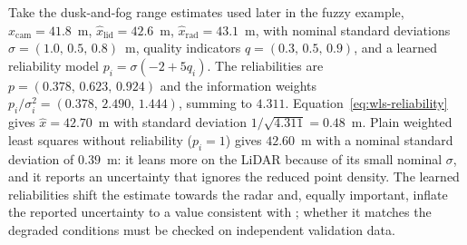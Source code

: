 \documentclass[graybox,envcountchap]{style/SNmono}
\providecommand{\DIFadd}[1]{{\protect\color{blue} #1}} %
\providecommand{\DIFdel}[1]{{\protect\color{red} #1}} %
\providecommand{\DIFaddbegin}{} %
\providecommand{\DIFaddend}{} %
\providecommand{\DIFdelbegin}{} %
\providecommand{\DIFdelend}{} %
\begin{document}
\begin{example}
\label{ex:logistic-wls}
Take the dusk-and-fog range estimates used later in the fuzzy example, $\widehat{x}_{\mathrm{cam}}=41.8$~m, $\widehat{x}_{\mathrm{lid}}=42.6$~m, $\widehat{x}_{\mathrm{rad}}=43.1$~m, with nominal standard deviations $\sigma=(1.0,\,0.5,\,0.8)$~m, quality indicators $q=(0.3,\,0.5,\,0.9)$, and a learned reliability model $p_i=\sigma(-2+5q_i)$. The reliabilities are $p=(0.378,\,0.623,\,0.924)$ and the information weights $p_i/\sigma_i^{2}=(0.378,\,2.490,\,1.444)$, summing to $4.311$. Equation~\eqref{eq:wls-reliability} gives $\widehat{x}=42.70$~m with standard deviation $1/\sqrt{4.311}=0.48$~m. Plain weighted least squares without reliability ($p_i=1$) gives $42.60$~m with a nominal standard deviation of $0.39$~m: it leans more on the LiDAR because of its small nominal $\sigma$, and it reports an uncertainty that ignores the reduced point density. The learned reliabilities shift the estimate towards the radar and, equally important, inflate the reported uncertainty\DIFdelbegin \DIFdel{to a value consistent with }\DIFdelend \DIFaddbegin \DIFadd{; whether it matches }\DIFaddend the degraded conditions \DIFaddbegin \DIFadd{must be checked on independent validation data}\DIFaddend .
\end{example}
\end{document}
